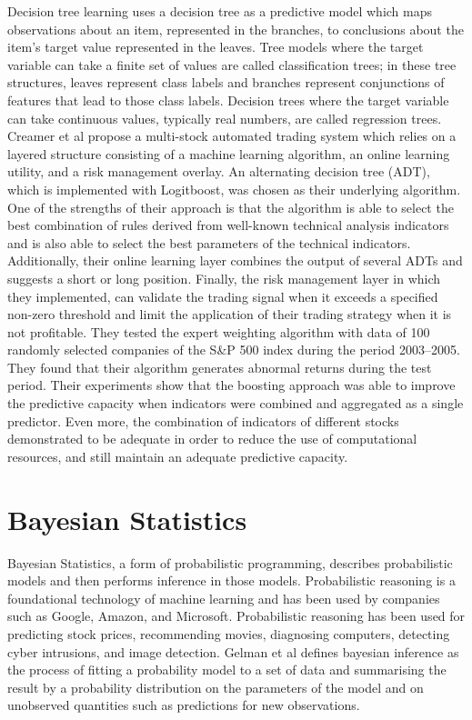Decision tree learning uses a decision tree as a predictive model which maps observations about an item, represented in the branches, to conclusions about the item's target value represented in the leaves. Tree models where the target variable can take a finite set of values are called classification trees; in these tree structures, leaves represent class labels and branches represent conjunctions of features that lead to those class labels. Decision trees where the target variable can take continuous values, typically real numbers, are called regression trees. Creamer et al propose a multi-stock automated trading system which relies on a layered structure consisting of a machine learning algorithm, an online learning utility, and a risk management overlay.\cite{Creamer:2010aa} An alternating decision tree (ADT), which is implemented with Logitboost, was chosen as their underlying algorithm. One of the strengths of their approach is that the algorithm is able to select the best combination of rules derived from well-known technical analysis indicators and is also able to select the best parameters of the technical indicators. Additionally, their online learning layer combines the output of several ADTs and suggests a short or long position. Finally, the risk management layer in which they implemented, can validate the trading signal when it exceeds a specified non-zero threshold and limit the application of their trading strategy when it is not profitable. They tested the expert weighting algorithm with data of 100 randomly selected companies of the S\&P 500 index during the period 2003–2005. They found that their algorithm generates abnormal returns during the test period. Their experiments show that the boosting approach was able to improve the predictive capacity when indicators were combined and aggregated as a single predictor. Even more, the combination of indicators of different stocks demonstrated to be adequate in order to reduce the use of computational resources, and still maintain an adequate predictive capacity.

\section{Bayesian Statistics}

Bayesian Statistics, a form of probabilistic programming, describes probabilistic models and then performs inference in those models. Probabilistic reasoning is a foundational technology of machine learning and has been used by companies such as Google, Amazon, and Microsoft. Probabilistic reasoning has been used for predicting stock prices, recommending movies, diagnosing computers, detecting cyber intrusions, and image detection. Gelman et al defines bayesian inference as the process of fitting a probability model to a set of data and summarising the result by a probability distribution on the parameters of the model and on unobserved quantities such as predictions for new observations.\cite{Gelman:2014aa}

